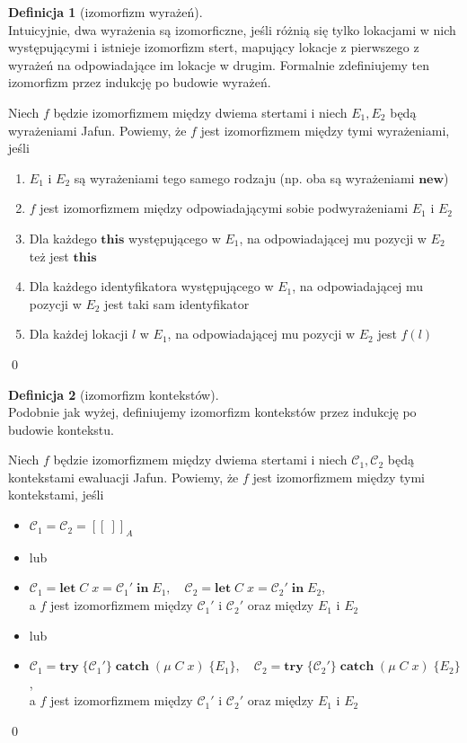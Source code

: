 \documentclass[]{pracamgr}
\renewcommand \| {\hspace{0.75em} | \hspace{0.75em} }
\renewcommand \[ {[\![}
\renewcommand \] {]\!]}
\theoremstyle{definition}
\newtheorem{definition}{Definicja}[section]
\newcommand{\mmod}{\mu\xspace}
\newcommand{\jlet}{\mathbf{let}\xspace}
\newcommand{\jin}{\mathbf{in}\xspace}
\newcommand{\jtry}{\mathbf{try}\xspace}
\newcommand{\jcatch}{\mathbf{catch}\xspace}
\newcommand{\jnew}{\mathbf{new}\xspace}
\newcommand{\jthis}{\textbf{this}\xspace}
\newcommand{\letin}[4]{\jlet\; #1\; #2 = #3\; \jin\; #4\xspace}
\newcommand{\tcatch}[4]{\jtry\; \boldsymbol{\{}#1\boldsymbol{\}}\; \jcatch\; (#2\; #3)\; \boldsymbol{\{}#4\boldsymbol{\}}\xspace}
\newcommand{\ctxt}{\mathcal{C}\xspace}
\begin{document}
\begin{definition}[izomorfizm wyrażeń] {\ } \\
Intuicyjnie, dwa wyrażenia są izomorficzne, jeśli różnią się tylko lokacjami w nich występującymi i istnieje
izomorfizm stert, mapujący lokacje z pierwszego z wyrażeń na odpowiadające im lokacje w drugim.
Formalnie zdefiniujemy ten izomorfizm przez indukcję po budowie wyrażeń.

Niech $f$ będzie izomorfizmem między dwiema stertami i niech $E_1, E_2$ będą wyrażeniami Jafun.
Powiemy, że $f$ jest izomorfizmem między tymi wyrażeniami, jeśli
\begin{enumerate}
 \item $E_1$ i $E_2$ są wyrażeniami tego samego rodzaju (np. oba są wyrażeniami $\jnew$)
 \item $f$ jest izomorfizmem między odpowiadającymi sobie podwyrażeniami $E_1$ i $E_2$
 \item Dla każdego $\jthis$ występującego w $E_1$, na odpowiadającej mu pozycji w $E_2$ też jest $\jthis$
 \item Dla każdego identyfikatora występującego w $E_1$, na odpowiadającej mu pozycji w $E_2$ jest taki sam identyfikator
 \item Dla każdej lokacji $l$ w $E_1$, na odpowiadającej mu pozycji w $E_2$ jest $f(l)$
\end{enumerate}
\qed
\end{definition}

\begin{definition}[izomorfizm kontekstów] {\ } \\
Podobnie jak wyżej, definiujemy izomorfizm kontekstów przez indukcję po budowie kontekstu.

Niech $f$ będzie izomorfizmem między dwiema stertami i niech $\ctxt_1, \ctxt_2$ będą kontekstami ewaluacji Jafun.
Powiemy, że $f$ jest izomorfizmem między tymi kontekstami, jeśli
\begin{itemize}
 \item $\ctxt_1 = \ctxt_2 =  \[ ~\]_A$
 \item[] lub
 \item $\ctxt_1 = \letin{C}{x}{\ctxt_1'}{E_1}, \quad
        \ctxt_2 = \letin{C}{x}{\ctxt_2'}{E_2}$, \\
    a $f$ jest izomorfizmem między $\ctxt_1'$ i $\ctxt_2'$ oraz między $E_1$ i $E_2$
 \item[] lub
 \item $\ctxt_1 = \tcatch{\ctxt_1'}{\mmod\; C}{x}{E_1},\quad
        \ctxt_2 = \tcatch{\ctxt_2'}{\mmod\; C}{x}{E_2}$, \\
    a $f$ jest izomorfizmem między $\ctxt_1'$ i $\ctxt_2'$ oraz między $E_1$ i $E_2$
\end{itemize}
\qed
\end{definition}
\end{document}
